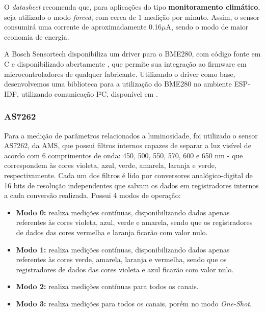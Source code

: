 \documentclass[../monografia.tex]{subfiles}
\begin{document}
O \textit{datasheet} recomenda que, para aplicações do tipo \textbf{monitoramento climático}, seja utilizado o modo \textit{forced}, com cerca de 1 medição por minuto. Assim, o sensor consumirá uma corrente de aproximadamente 0.16$\mu$A, sendo o modo de maior economia de energia. 

A Bosch Sensortech disponibiliza um driver para o BME280, com código fonte em C e disponibilizado abertamente \cite{bme280-driver}, que permite sua integração ao firmware em microcontroladores de qualquer fabricante. 
Utilizando o driver como base, desenvolvemos uma biblioteca para a utilização do BME280 no ambiente ESP-IDF, utilizando comunicação I²C, disponível em \cite{bme280-lib}.



\subsubsection{AS7262} \label{as7262}

Para a medição de parâmetros relacionados a luminosidade, foi utilizado o sensor AS7262, da AMS, que possui filtros internos capazes de separar a luz visível de acordo com 6 comprimentos de onda: 450, 500, 550, 570, 600 e 650 nm - que correspondem às cores violeta, azul, verde, amarela, laranja e verde, respectivamente. Cada um dos filtros é lido por conversores analógico-digital de 16 bits de resolução independentes que salvam os dados em registradores internos a cada conversão realizada. Possui 4 modos de operação:

\begin{itemize}
	\item \textbf{Modo 0:} realiza medições contínuas, disponibilizando dados apenas referentes às cores violeta, azul, verde e amarela, sendo que os registradores de dados das cores vermelha e laranja ficarão com valor nulo.
	\item \textbf{Modo 1:} realiza medições contínuas, disponibilizando dados apenas referentes às cores verde, amarela, laranja e vermelha, sendo que os registradores de dados das cores violeta e azul ficarão com valor nulo.
	\item \textbf{Modo 2:} realiza medições contínuas para todos os canais.
	\item \textbf{Modo 3:} realiza medições para todos os canais, porém no modo \textit{One-Shot}.
\end{itemize}
\end{document}

